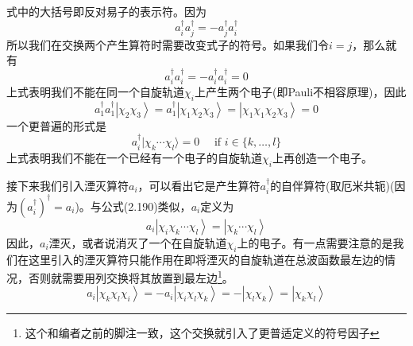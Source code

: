 \documentclass[12pt,a4paper,openany,twoside]{book}
\numberwithin{equation}{section}
\begin{document}
          式中的大括号即反对易子的表示符。因为
          \begin{equation}
            a_{i}^{\dagger} a_{j}^{\dagger}=-a_{j}^{\dagger} a_{i}^{\dagger}
          \end{equation}
          所以我们在交换两个产生算符时需要改变式子的符号。如果我们令$i=j$，那么就有
          \begin{equation}
            a_{i}^{\dagger} a_{i}^{\dagger}=-a_{i}^{\dagger} a_{i}^{\dagger}=0
          \end{equation}
          上式表明我们不能在同一个自旋轨道$\chi_i$上产生两个电子(即Pauli不相容原理)，因此
          \begin{equation}
            a_1^{\dagger}a_1^{\dagger}\left|\chi_2\chi_3\right\rangle=a_1^{\dagger}\left|\chi_1\chi_2\chi_3\right\rangle=\left|\chi_1\chi_1\chi_2\chi_3\right\rangle=0
          \end{equation}
          一个更普遍的形式是
          \begin{equation}
            a_{i}^{\dagger} | \chi_{k} \cdots \chi_{l} \rangle=0 \quad \text { if } i \in\{k, \ldots, l\}
          \end{equation}
          上式表明我们不能在一个已经有一个电子的自旋轨道$\chi_i$上再创造一个电子。
          
          接下来我们引入湮灭算符$a_i$，可以看出它是产生算符$a_i^{\dagger}$的自伴算符(取厄米共轭)(因为$(a_i^{\dagger})^\dagger=a_i$)。与公式(2.190)类似，$a_i$定义为
          \begin{equation}
            a_i\left|\chi_i\chi_k\cdots\chi_l\right\rangle=\left|\chi_k\cdots\chi_l\right\rangle
            \label{annihilation operator}
          \end{equation}
          因此，$a_i$湮灭，或者说消灭了一个在自旋轨道$\chi_i$上的电子。有一点需要注意的是我们在这里引入的湮灭算符只能作用在即将湮灭的自旋轨道在总波函数最左边的情况，否则就需要用列交换将其放置到最左边\footnote{这个和编者之前的脚注一致，这个交换就引入了更普适定义的符号因子}。
          \begin{equation}
            a_i\left|\chi_k\chi_l\chi_i\right\rangle=-a_i\left|\chi_i\chi_l\chi_k\right\rangle
            =-\left|\chi_l\chi_k\right\rangle=\left|\chi_k\chi_l\right\rangle
          \end{equation}
          
\end{document}
